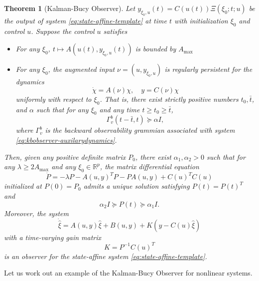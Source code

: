\documentclass[
]{book}
\newtheorem{theorem}{Theorem}[chapter]
\theoremstyle{definition}
\theoremstyle{definition}
\theoremstyle{definition}
\theoremstyle{definition}
\theoremstyle{remark}
\begin{document}
\begin{theorem}[Kalman-Bucy Observer]
\protect\hypertarget{thm:kalmanbucystateaffine}{}\label{thm:kalmanbucystateaffine}Let \(y_{\xi_0,u}(t) = C(u(t)) \Xi (\xi_0;t;u)\) be the output of system \eqref{eq:state-affine-template} at time \(t\) with initialization \(\xi_0\) and control \(u\). Suppose the control \(u\) satisfies

\begin{itemize}
\item
  For any \(\xi_0\), \(t \mapsto A(u(t),y_{\xi_0,u}(t))\) is bounded by \(A_{\max}\)
\item
  For any \(\xi_0\), the augmented input \(\nu = (u,y_{\xi_0,u})\) is \emph{regularly persistent} for the dynamics
  \begin{equation}
  \dot{\chi} = A(\nu) \chi , \quad y = C(\nu) \chi 
  \label{eq:kbobserver-auxilarydynamics}
  \end{equation}
  uniformly with respect to \(\xi_0\). That is, there exist strictly positive numbers \(t_0,\bar{t}\), and \(\alpha\) such that for any \(\xi_0\) and any time \(t \geq t_0 \geq \bar{t}\),
  \[
  \Gamma_v^b (t-\bar{t}, t) \succeq \alpha I,
  \]
  where \(\Gamma_v^b\) is the \emph{backward observability grammian} associated with system \eqref{eq:kbobserver-auxilarydynamics}.
\end{itemize}

Then, given any positive definite matrix \(P_0\), there exist \(\alpha_1,\alpha_2 > 0\) such that for any \(\lambda \geq 2 A_{\max}\) and any \(\xi_0 \in \mathbb{R}^p\), the matrix differential equation
\begin{equation}
\dot{P} = -\lambda P - A(u,y)^T P - P A(u,y) + C(u)^T C(u)
\label{eq:kbobserver-matrixdifferential}
\end{equation}
initialized at \(P(0) = P_0\) admits a unique solution satisfying \(P(t)=P(t)^T\) and
\[
\alpha_2 I \succeq P(t) \succeq \alpha_1 I.
\]
Moreover, the system
\begin{equation}
\dot{\hat{\xi}} = A(u,y) \hat{\xi} + B(u,y) + K (y - C(u)\hat{\xi})
\label{eq:kbobserver-observer}
\end{equation}
with a time-varying gain matrix
\begin{equation}
K = P^{-1} C(u)^T 
\label{eq:kbobserver-gain}
\end{equation}
is an observer for the state-affine system \eqref{eq:state-affine-template}.
\end{theorem}

Let us work out an example of the Kalman-Bucy Observer for nonlinear systems.
\end{document}

